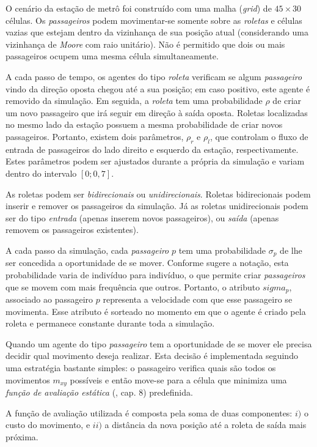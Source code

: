 \documentclass[preprint,12pt]{elsarticle}
\begin{document}
O cenário da estação de metrô foi construído com uma malha (\textit{grid}) de $45 \times 30$ células. Os \textit{passageiros} podem movimentar-se somente sobre as \textit{roletas} e células vazias que estejam dentro da vizinhança de sua posição atual (considerando uma vizinhança de \textit{Moore} com raio unitário). Não é permitido que dois ou mais passageiros ocupem uma mesma célula simultaneamente. 

A cada passo de tempo, os agentes do tipo \textit{roleta} verificam se algum \textit{passageiro} vindo da direção oposta chegou até a sua posição; em caso positivo, este agente é removido da simulação. Em seguida, a \textit{roleta} tem uma probabilidade $\rho$ de criar um novo passageiro que irá seguir em direção à saída oposta. Roletas localizadas no mesmo lado da estação possuem a mesma probabilidade de criar novos passageiros. Portanto, existem dois parâmetros, $\rho_r$ e $\rho_l$, que controlam o fluxo de entrada de passageiros do lado direito e esquerdo da estação, respectivamente. Estes parâmetros podem ser ajustados durante a própria da simulação e variam dentro do intervalo $[0; 0,7]$.

As roletas podem ser \textit{bidirecionais} ou \textit{unidirecionais}. Roletas bidirecionais podem inserir e remover os passageiros da simulação. Já as roletas unidirecionais podem ser do tipo \textit{entrada} (apenas inserem novos passageiros), ou \textit{saída} (apenas removem os passageiros existentes). 

A cada passo da simulação, cada \textit{passageiro} $p$ tem uma probabilidade $\sigma_p$ de lhe ser concedida a oportunidade de se mover. Conforme sugere a notação, esta probabilidade varia de indivíduo para indivíduo, o que permite criar \textit{passageiros} que se movem com mais frequência que outros. Portanto, o atributo $sigma_p$, associado ao passageiro $p$ representa a velocidade com que esse passageiro se movimenta. Esse atributo é sorteado no momento em que o agente é criado pela roleta e permanece constante durante toda a simulação.

Quando um agente do tipo \textit{passageiro} tem a oportunidade de se mover ele precisa decidir qual movimento deseja realizar. Esta decisão é implementada seguindo uma estratégia bastante simples: o passageiro verifica quais são todos os movimentos $m_{xy}$ possíveis e então move-se para a célula que minimiza uma \textit{função de avaliação estática} (\cite{millington2016artificial}, cap. 8) predefinida.

A função de avaliação utilizada é composta pela soma de duas componentes: $i)$ o custo do movimento, e $ii)$ a distância da nova posição até a roleta de saída mais próxima.
\end{document}
